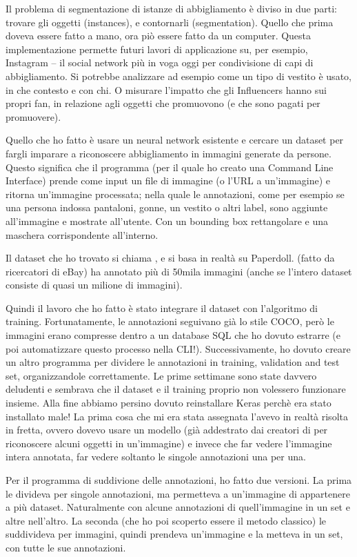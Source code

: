 Il problema di segmentazione di istanze di abbigliamento è diviso in due parti: trovare gli oggetti (instances), e contornarli (segmentation). Quello che prima doveva essere fatto a mano, ora piò essere fatto da un computer. Questa implementazione permette futuri lavori di applicazione su, per esempio, Instagram -- il social network più in voga oggi per condivisione di capi di abbigliamento. Si potrebbe analizzare ad esempio come un tipo di vestito è usato, in che contesto e con chi. O misurare l'impatto che gli Influencers hanno sui propri fan, in relazione agli oggetti che promuovono (e che sono pagati per promuovere).

Quello che ho fatto è usare un neural network esistente e cercare un dataset per fargli imparare a riconoscere abbigliamento in immagini generate da persone. Questo significa che il programma (per il quale ho creato una Command Line Interface) prende come input un file di immagine (o l'URL a un'immagine) e ritorna un'immagine processata; nella quale le annotazioni, come per esempio se una persona indossa pantaloni, gonne, un vestito o altri label, sono aggiunte all'immagine e mostrate all'utente. Con un bounding box rettangolare e una maschera corrispondente all'interno.

Il dataset che ho trovato si chiama \modanet, e si basa in realtà su Paperdoll.
\modanet (fatto da ricercatori di eBay) ha annotato più di 50mila immagini (anche se l'intero dataset consiste di quasi un milione di immagini).

Quindi il lavoro che ho fatto è stato integrare il dataset con l'algoritmo di training. Fortunatamente, le annotazioni \modanet seguivano già lo stile COCO, però le immagini erano compresse dentro a un database SQL che ho dovuto estrarre (e poi automatizzare questo processo nella CLI!). Successivamente, ho dovuto creare un altro programma per dividere le annotazioni in training, validation and test set, organizzandole correttamente.
Le prime settimane sono state davvero deludenti e sembrava che il dataset e il training proprio non volessero funzionare insieme. Alla fine abbiamo persino dovuto reinstallare Keras perchè era stato installato male! La prima cosa che mi era stata assegnata l'avevo in realtà risolta in fretta, ovvero dovevo usare un modello (già addestrato dai creatori di \maskrcnn per riconoscere alcuni oggetti in un'immagine) e invece che far vedere l'immagine intera annotata, far vedere soltanto le singole annotazioni una per una.

Per il programma di suddivione delle annotazioni, ho fatto due versioni. La prima le divideva per singole annotazioni, ma permetteva a un'immagine di appartenere a più dataset. Naturalmente con alcune annotazioni di quell'immagine in un set e altre nell'altro. La seconda (che ho poi scoperto essere il metodo classico) le suddivideva per immagini, quindi prendeva un'immagine e la metteva in un set, con tutte le sue annotazioni.

